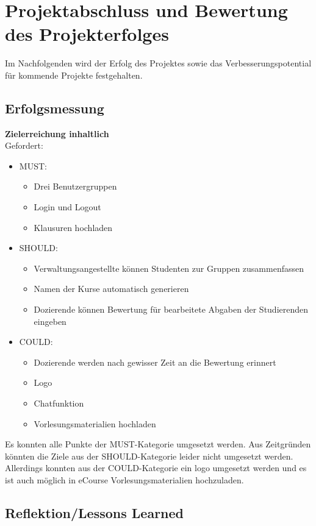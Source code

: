 \chapter{Projektabschluss und Bewertung des Projekterfolges}

\label{sec:Chap7}

Im Nachfolgenden wird der Erfolg des Projektes sowie das Verbesserungspotential für kommende Projekte festgehalten.

\section{Erfolgsmessung}

\textbf{Zielerreichung inhaltlich} \\
Gefordert:
\begin{itemize}
\item MUST:
\begin{itemize}
\item Drei Benutzergruppen
\item Login und Logout
\item Klausuren hochladen
\end{itemize}
\item SHOULD:
\begin{itemize}
\item Verwaltungsangestellte können Studenten zur Gruppen zusammenfassen
\item Namen der Kurse automatisch generieren
\item Dozierende können Bewertung für bearbeitete Abgaben der Studierenden eingeben
\end{itemize}
\item COULD:
\begin{itemize}
\item Dozierende werden nach gewisser Zeit an die Bewertung erinnert
\item Logo
\item Chatfunktion
\item Vorlesungsmaterialien hochladen
\end{itemize}
\end{itemize}

Es konnten alle Punkte der MUST-Kategorie umgesetzt werden. Aus Zeitgründen könnten die Ziele aus der SHOULD-Kategorie leider nicht umgesetzt werden. Allerdings konnten aus der COULD-Kategorie ein logo umgesetzt werden und es ist auch möglich in eCourse Vorlesungsmaterialien hochzuladen.

\section{Reflektion/Lessons Learned}

